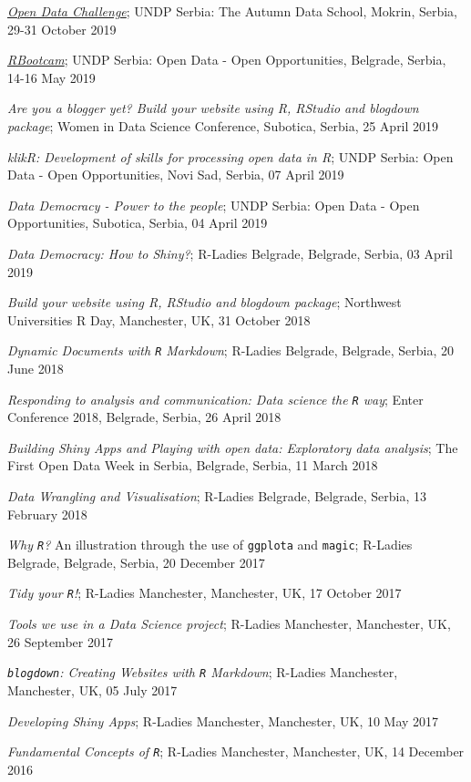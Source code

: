 \documentclass[
]{article}
\begin{document}
\emph{\href{https://datachallengewithr.rbind.io}{Open Data Challenge}};
UNDP Serbia: The Autumn Data School, Mokrin, Serbia, 29-31 October 2019

\emph{\href{http://rbootcamp.rbind.io/}{RBootcam}}; UNDP Serbia: Open
Data - Open Opportunities, Belgrade, Serbia, 14-16 May 2019

\emph{Are you a blogger yet? Build your website using R, RStudio and
blogdown package}; Women in Data Science Conference, Subotica, Serbia,
25 April 2019

\emph{klikR: Development of skills for processing open data in R}; UNDP
Serbia: Open Data - Open Opportunities, Novi Sad, Serbia, 07 April 2019

\emph{Data Democracy - Power to the people}; UNDP Serbia: Open Data -
Open Opportunities, Subotica, Serbia, 04 April 2019

\emph{Data Democracy: How to Shiny?}; R-Ladies Belgrade, Belgrade,
Serbia, 03 April 2019

\emph{Build your website using R, RStudio and blogdown package};
Northwest Universities R Day, Manchester, UK, 31 October 2018

\emph{Dynamic Documents with \texttt{R} Markdown}; R-Ladies Belgrade,
Belgrade, Serbia, 20 June 2018

\emph{Responding to analysis and communication: Data science the
\texttt{R} way}; Enter Conference 2018, Belgrade, Serbia, 26 April 2018

\emph{Building Shiny Apps and Playing with open data: Exploratory data
analysis}; The First Open Data Week in Serbia, Belgrade, Serbia, 11
March 2018

\emph{Data Wrangling and Visualisation}; R-Ladies Belgrade, Belgrade,
Serbia, 13 February 2018

\emph{Why \texttt{R}?} An illustration through the use of
\texttt{ggplota} and \texttt{magic}; R-Ladies Belgrade, Belgrade,
Serbia, 20 December 2017

\emph{Tidy your \texttt{R}!}; R-Ladies Manchester, Manchester, UK, 17
October 2017

\emph{Tools we use in a Data Science project}; R-Ladies Manchester,
Manchester, UK, 26 September 2017

\emph{\texttt{blogdown}: Creating Websites with \texttt{R} Markdown};
R-Ladies Manchester, Manchester, UK, 05 July 2017

\emph{Developing Shiny Apps}; R-Ladies Manchester, Manchester, UK, 10
May 2017

\emph{Fundamental Concepts of \texttt{R}}; R-Ladies Manchester,
Manchester, UK, 14 December 2016
\end{document}
